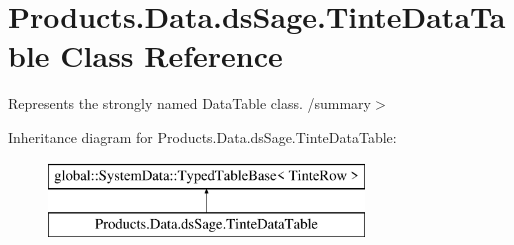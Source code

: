 \hypertarget{class_products_1_1_data_1_1ds_sage_1_1_tinte_data_table}{}\section{Products.\+Data.\+ds\+Sage.\+Tinte\+Data\+Table Class Reference}
\label{class_products_1_1_data_1_1ds_sage_1_1_tinte_data_table}


Represents the strongly named Data\+Table class. /summary$>$  


Inheritance diagram for Products.\+Data.\+ds\+Sage.\+Tinte\+Data\+Table\+:\begin{figure}[H]
\begin{center}
\leavevmode
\includegraphics[height=2.000000cm]{class_products_1_1_data_1_1ds_sage_1_1_tinte_data_table}
\end{center}
\end{figure}
